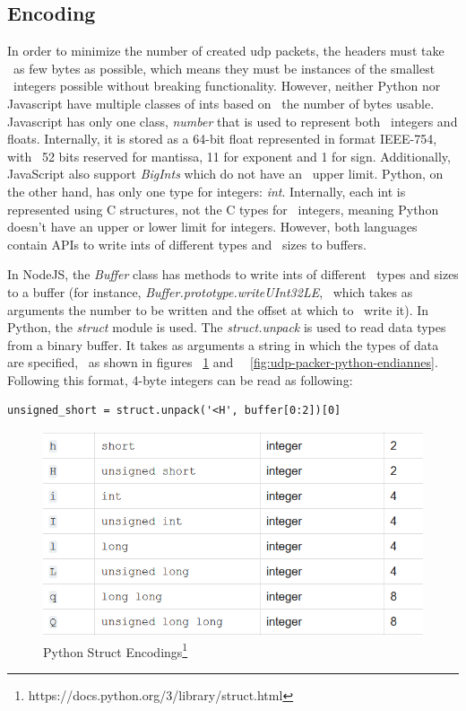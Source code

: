 \subsection{Encoding}
\label{subsec:udp-packer-encoding}
In order to minimize the number of created udp packets, the headers must take \
as few bytes as possible, which means they must be instances of the smallest \
integers possible without breaking functionality.
However, neither Python nor Javascript have multiple classes of ints based on \
the number of bytes usable.
Javascript has only one class, \textit{number} that is used to represent both \
integers and floats.
Internally, it is stored as a 64-bit float represented in format IEEE-754, with \
52 bits reserved for mantissa, 11 for exponent and 1 for sign.
Additionally, JavaScript also support \textit{BigInts} which do not have an \
upper limit.
Python, on the other hand, has only one type for integers: \textit{int}.
Internally, each int is represented using C structures, not the C types for \
integers, meaning Python doesn't have an upper or lower limit for integers.
However, both languages contain APIs to write ints of different types and \
sizes to buffers.

In NodeJS, the \textit{Buffer} class has methods to write ints of different \
types and sizes to a buffer (for instance, \textit{Buffer.prototype.writeUInt32LE}, \
which takes as arguments the number to be written and the offset at which to \
write it).
In Python, the \textit{struct} module is used.
The \textit{struct.unpack} is used to read data types from a binary buffer.
It takes as arguments a string in which the types of data are specified, \
as shown in figures ~\ref{fig:udp-packer-python-structs} and \
~\ref{fig:udp-packer-python-endiannes}.
Following this format, 4-byte integers can be read as following: \
\begin{verbatim}
unsigned_short = struct.unpack('<H', buffer[0:2])[0]
\end{verbatim}

\begin{figure}[ht]
    \label{fig:udp-packer-python-structs}
    \includegraphics[keepaspectratio]{img/python-structs.png}
    \caption{Python Struct Encodings\footnote{https://docs.python.org/3/library/struct.html}}
\end{figure}

